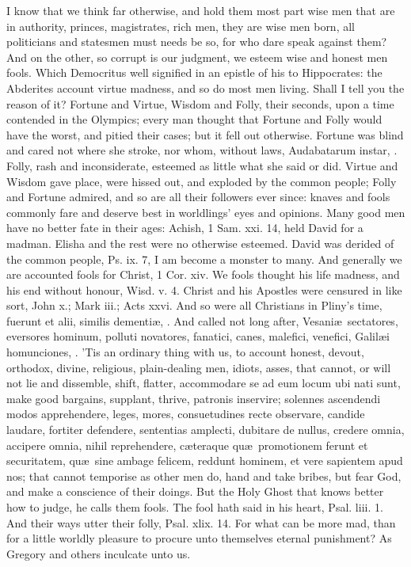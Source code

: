 {I know that we think far otherwise, and hold them most part wise men
that are in authority, princes, magistrates, rich men, they are
wise men born, all politicians and statesmen must needs be so, for who
dare speak against them? And on the other, so corrupt is our judgment,
we esteem wise and honest men fools. Which Democritus well signified in
an epistle of his to Hippocrates: the Abderites account virtue
madness, and so do most men living. Shall I tell you the reason of it?
Fortune and Virtue, Wisdom and Folly, their seconds, upon a time
contended in the Olympics; every man thought that Fortune and Folly
would have the worst, and pitied their cases; but it fell out
otherwise. Fortune was blind and cared not where she stroke, nor whom,
without laws, Audabatarum instar, \etc. Folly, rash and inconsiderate,
esteemed as little what she said or did. Virtue and Wisdom gave
place, were hissed out, and exploded by the common people; Folly
and Fortune admired, and so are all their followers ever since: knaves
and fools commonly fare and deserve best in worldlings' eyes and
opinions. Many good men have no better fate in their ages: Achish, 1
Sam. xxi. 14, held David for a madman. Elisha and the rest were no
otherwise esteemed. David was derided of the common people, Ps. ix. 7,
I am become a monster to many. And generally we are accounted fools for
Christ, 1 Cor. xiv. We fools thought his life madness, and his end
without honour, Wisd. v. 4. Christ and his Apostles were censured in
like sort, John x.; Mark iii.; Acts xxvi. And so were all Christians in
Pliny's time, fuerunt et alii, similis dementi\ae{}, \etc. And called
not long after, Vesani\ae{}\ sectatores, eversores hominum, polluti
novatores, fanatici, canes, malefici, venefici, Galil\ae{}i homunciones,
\etc. 'Tis an ordinary thing with us, to account honest, devout,
orthodox, divine, religious, plain-dealing men, idiots, asses, that
cannot, or will not lie and dissemble, shift, flatter, accommodare se
ad eum locum ubi nati sunt, make good bargains, supplant, thrive,
patronis inservire; solennes ascendendi modos apprehendere, leges,
mores, consuetudines recte observare, candide laudare, fortiter
defendere, sententias amplecti, dubitare de nullus, credere omnia,
accipere omnia, nihil reprehendere, c\ae{}teraque qu\ae{}\ promotionem ferunt
et securitatem, qu\ae{}\ sine ambage felicem, reddunt hominem, et vere
sapientem apud nos; that cannot temporise as other men do, hand
and take bribes, \etc but fear God, and make a conscience of their
doings. But the Holy Ghost that knows better how to judge, he calls
them fools. The fool hath said in his heart, Psal. liii. 1. And their
ways utter their folly, Psal. xlix. 14. For what can be more mad,
than for a little worldly pleasure to procure unto themselves eternal
punishment? As Gregory and others inculcate unto us.

}
